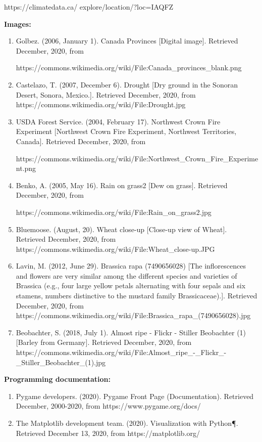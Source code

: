 \documentclass[fontsize=11pt]{article}
\begin{document}
\begin{enumerate}
    https://climatedata.ca/ explore/location/?loc=IAQFZ
\end{enumerate}

\textbf{Images:}\\
\begin{enumerate}
    \item Golbez. (2006, January 1). Canada Provinces [Digital image]. Retrieved December, 2020, from
    
    https://commons.wikimedia.org/wiki/File:Canada\_provinces\_blank.png
    \item Castelazo, T. (2007, December 6). Drought [Dry ground in the Sonoran Desert, Sonora, Mexico.]. Retrieved December, 2020, from https://commons.wikimedia.org/wiki/File:Drought.jpg
    \item USDA Forest Service. (2004, February 17). Northwest Crown Fire Experiment [Northwest Crown Fire Experiment, Northwest Territories, Canada]. Retrieved December, 2020, from
    
    https://commons.wikimedia.org/wiki/File:Northwest\_Crown\_Fire\_Experiment.png
    \item Benko, A. (2005, May 16). Rain on grass2 [Dew on grass]. Retrieved December, 2020, from
    
    https://commons.wikimedia.org/wiki/File:Rain\_on\_grass2.jpg
    \item Bluemoose. (August, 20). Wheat close-up [Close-up view of Wheat]. Retrieved December, 2020, from https://commons.wikimedia.org/wiki/File:Wheat\_close-up.JPG
    \item Lavin, M. (2012, June 29). Brassica rapa (7490656028) [The inflorescences and flowers are very similar among the different species and varieties of Brassica (e.g., four large yellow petals alternating with four sepals and six stamens, numbers distinctive to the mustard family Brassicaceae).]. Retrieved December, 2020, from https://commons.wikimedia.org/wiki/File:Brassica\_rapa\_(7490656028).jpg
    \item Beobachter, S. (2018, July 1). Almost ripe - Flickr - Stiller Beobachter (1) [Barley from Germany]. Retrieved December, 2020, from https://commons.wikimedia.org/wiki/File:Almost\_ripe\_-\_Flickr\_-\_Stiller\_Beobachter\_(1).jpg
\end{enumerate}

\textbf{Programming documentation:}\\
\begin{enumerate}
    \item Pygame developers. (2020). Pygame Front Page (Documentation). Retrieved December, 2000-2020, from https://www.pygame.org/docs/
    \item The Matplotlib development team. (2020). Visualization with Python¶. Retrieved December 13, 2020, from https://matplotlib.org/
\end{enumerate}


\end{document}
